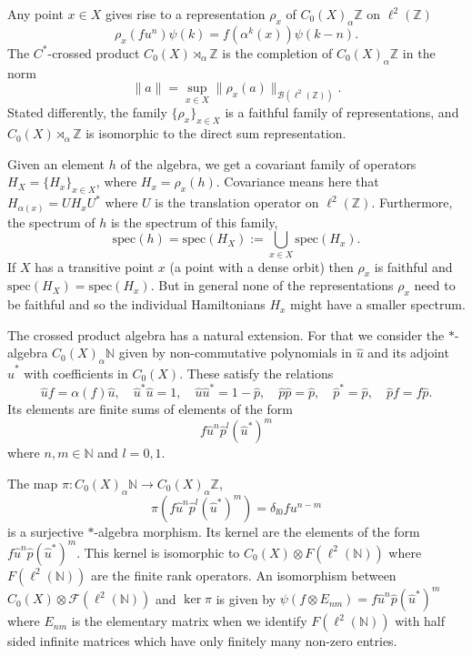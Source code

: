 \documentclass[11pt]{amsart}
\newcommand{\Z}{\mathbb{Z}}
\newcommand{\N}{\mathbb{N}}
\renewcommand{\b}{\psi}
\begin{document}
Any point $x\in X$ gives rise to a representation $\rho_x$ of $C_0(X)_\alpha \Z$ on $\ell^2(\Z)$
$$\rho_{x}(f u^n)\psi(k) = f(\alpha^k(x)) \psi(k-n).$$
The $C^*$-crossed product $C_0(X)\rtimes_\alpha\Z $ is the completion of $C_0(X)_\alpha\Z$ in the norm
$$\lVert a \rVert=\sup_{x\in X}\lVert \rho_{x}(a) \rVert_{\mathcal{B}(\ell^2(\Z))}.$$
Stated differently, the family $\{\rho_x\}_{x\in X}$ is a faithful family of representations, and $C_0(X)\rtimes_\alpha\Z $ is isomorphic to the direct sum representation. 

Given an element $h$ of the algebra, we get a covariant family of operators $H_X=\{H_x\}_{x\in X}$, where $H_x=\rho_x(h)$. 
Covariance means here that $H_{\alpha(x)} = U H_{x} U^*$ where $U$ is the translation operator on $\ell^2(\Z)$. Furthermore, the spectrum of $h$ is the spectrum of this family,
$$\mathrm{spec}(h)=\mathrm{spec}(H_X):=\bigcup_{x\in X} \mathrm{spec}(H_x).$$
If $X$ has a transitive point $x$ (a point with a dense orbit) then $\rho_x$ is faithful and
$\mathrm{spec}(H_X)= \mathrm{spec}(H_x)$. But in general none of the representations $\rho_x$ need to be faithful and so the individual Hamiltonians $H_x$ might have a smaller spectrum. 

The crossed product algebra has a natural extension. For that we consider 
the $*$-algebra $C_0(X)_\alpha \N$ given by non-commutative polynomials in $\hat u$ and its adjoint $\hat u^*$ with coefficients in $C_0(X)$. These satisfy the relations
$$\hat{u}f  = \alpha(f)\hat{u},\quad \hat{u}^*\hat{u} = 1,\quad  
\hat{u}\hat{u}^* = 1 - \hat{p},\quad \hat{p}\hat{p}=\hat{p}, \quad \hat{p}^*=\hat{p},\quad \hat{p} f= f\hat{p} .$$
Its elements are finite sums of elements of the form
$$f \hat u^n \hat p^l ({\hat u^*})^m$$ 
where $n,m\in\N$ and $l=0,1$. 

The map $\pi:C_0(X)_\alpha \N\to C_0(X)_\alpha \Z$,
$$\pi(f \hat u^n \hat p^l ({\hat u^*})^m) = \delta_{l 0}f u^{n-m}$$
is a surjective $*$-algebra morphism. Its kernel are the elements of the form $f \hat u^n \hat p ({\hat u^*})^m$. This kernel is isomorphic to 
$C_0(X)\otimes F(\ell^2(\N))$ where $F(\ell^2(\N))$ are the finite rank operators. An isomorphism between $C_0(X)\otimes \mathcal{F}(\ell^2(\N))$ and $\ker \pi$ is given by  $\b(f \otimes E_{nm}) = f \hat{u}^n \hat p (\hat{u}^*)^m$ where $E_{nm}$ is the elementary matrix when we identify $F(\ell^2(\N))$ with half sided infinite matrices which have only finitely many non-zero entries.
\end{document}
